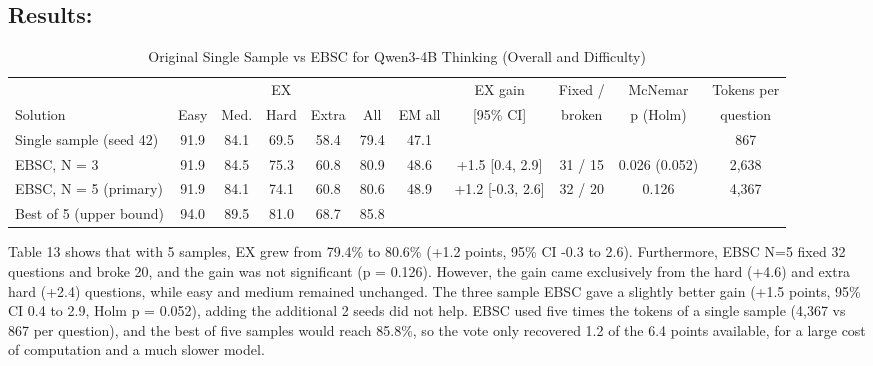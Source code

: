 \FloatBarrier
\subsection*{Results:}

\begin{table}[!htbp]
\centering
\caption{Original Single Sample vs EBSC for Qwen3-4B Thinking (Overall and Difficulty)}
\label{tab:13}
\small
\begin{adjustbox}{max width=\linewidth}
\begin{tabular}{@{}lcccccccccc@{}}
\toprule
 & \multicolumn{5}{c}{EX} &  & EX gain & Fixed / & McNemar & Tokens per \\
\cmidrule(lr){2-6}
Solution & Easy & Med. & Hard & Extra & All & EM all & [95\% CI] & broken & p (Holm) & question \\
\midrule
Single sample (seed 42) & 91.9 & 84.1 & 69.5 & 58.4 & 79.4 & 47.1 &  &  &  & 867 \\
EBSC, N = 3 & 91.9 & 84.5 & 75.3 & 60.8 & 80.9 & 48.6 & +1.5 [0.4, 2.9] & 31 / 15 & 0.026 (0.052) & 2,638 \\
EBSC, N = 5 (primary) & 91.9 & 84.1 & 74.1 & 60.8 & 80.6 & 48.9 & +1.2 [-0.3, 2.6] & 32 / 20 & 0.126 & 4,367 \\
Best of 5 (upper bound) & 94.0 & 89.5 & 81.0 & 68.7 & 85.8 &  &  &  &  &  \\
\bottomrule
\end{tabular}
\end{adjustbox}
\par{}
\end{table}

Table 13 shows that with 5 samples, EX grew from 79.4\% to 80.6\% (+1.2 points, 95\% CI -0.3 to 2.6). Furthermore, EBSC N=5 fixed 32 questions and broke 20, and the gain was not significant (p = 0.126). However, the gain came exclusively from the hard (+4.6) and extra hard (+2.4) questions, while easy and medium remained unchanged. The three sample EBSC gave a slightly better gain (+1.5 points, 95\% CI 0.4 to 2.9, Holm p = 0.052), adding the additional 2 seeds did not help. EBSC used five times the tokens of a single sample (4,367 vs 867 per question), and the best of five samples would reach 85.8\%, so the vote only recovered 1.2 of the 6.4 points available, for a large cost of computation and a much slower model.

